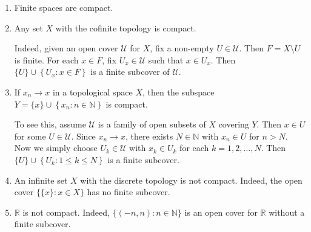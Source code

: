 \documentclass[a4paper,11pt]{article}
\begin{document}
\begin{example}
    \begin{enumerate}
        \item Finite spaces are compact.
      
        \item Any set $X$ with the cofinite topology is compact. 
        
        Indeed, given an open cover $\mathcal{U}$ for $X$, fix a non-empty $U \in \mathcal{U}$. Then $F=X \setminus U$ is finite. For each $x \in F$, fix $U_{x} \in \mathcal{U}$ such that $x \in U_{x}$. Then $\{U\} \cup\left\{U_{x}: x \in F\right\}$ is a finite subcover of $\mathcal{U}$.
        \item If $x_{n} \rightarrow x$ in a topological space $X$, then the subspace $Y=\{x\} \cup\left\{x_{n}: n \in \mathbb{N}\right\}$ is compact. 
        
        To see this, assume $\mathcal{U}$ is a family of open subsets of $X$ covering $Y$. Then $x \in U$ for some $U \in \mathcal{U}$. Since $x_{n} \rightarrow x$, there exists $N \in \mathbb{N}$ with $x_{n} \in U$ for $n>N$. Now we simply choose $U_{k} \in \mathcal{U}$ with $x_{k} \in U_{k}$ for each $k=1,2, \ldots, N$. Then $\{U\} \cup\left\{U_{k}: 1 \leqslant k \leqslant N\right\}$ is a finite subcover.

        \item An infinite set $X$ with the discrete topology is not compact. Indeed, the open cover $\{\{x\}: x \in X\}$ has no finite subcover.

  \item $\mathbb{R}$ is not compact. Indeed, $\{(-n, n): n \in \mathbb{N}\}$ is an open cover for $\mathbb{R}$ without a finite subcover.
      \end{enumerate}
\end{example}
\end{document}
